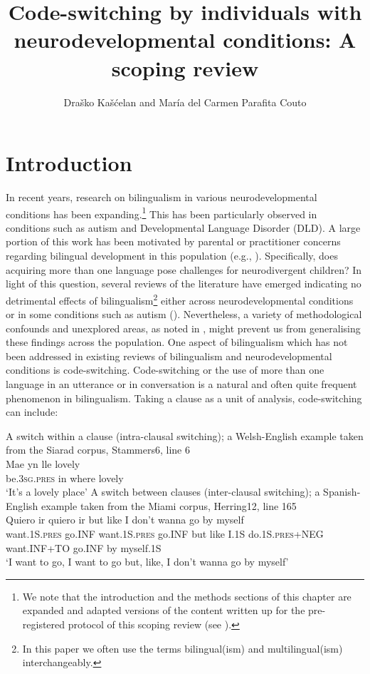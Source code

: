 \documentclass[output=paper]{langscibook}
\author{Draško Kašćelan\orcid{}\affiliation{University of Essex} and María del Carmen Parafita Couto\orcid{}\affiliation{University of Santiago de Compostela}}
\title[Code-switching by individuals with neurodevelopmental conditions]{Code-switching by individuals with neurodevelopmental conditions: A scoping review}
\begin{document}
\maketitle 

\section{Introduction}

In recent years, research on bilingualism in various neurodevelopmental conditions has been expanding.\footnote{We note that the introduction and the methods sections of this chapter are expanded and adapted versions of the content written up for the pre-registered protocol of this scoping review (see \citealt{KascelanParafitaCouto2022}).} This has been particularly observed in conditions such as autism and Developmental Language Disorder (DLD). A large portion of this work has been motivated by parental or practitioner concerns regarding bilingual development in this population (e.g.,  \citealt{Kay-RainingBirdEtAl2012}). Specifically, does acquiring more than one language pose challenges for neurodivergent children? In light of this question, several reviews of the literature have emerged indicating no detrimental effects of bilingualism\footnote{In this paper we often use the terms bilingual(ism) and multilingual(ism) interchangeably.} either across neurodevelopmental conditions \citep{UljarevićEtAl2016} or in some conditions such as autism (\citealt{PrévostTuller2021}). Nevertheless, a variety of methodological confounds and unexplored areas, as noted in \citet{PrévostTuller2021}, might prevent us from generalising these findings across the population.
One aspect of bilingualism which has not been addressed in existing reviews of bilingualism and neurodevelopmental conditions is code-switching. Code-switching or the use of more than one language in an utterance or in conversation is a natural and often quite frequent phenomenon in bilingualism. Taking a clause as a unit of analysis, code-switching can include:

\ea
  \ea \label{ex1a} A switch within a clause (intra-clausal switching); a Welsh-English example taken from the Siarad corpus, Stammers6, line 6 \citep{DeucharEtAl2014}\\
      \gll Mae      yn    lle    lovely\\
      be.3\textsc{sg}.\textsc{pres}  in  where  lovely\\
      \glt ‘It’s a lovely place’
  \ex \label{ex1b} A switch between clauses (inter-clausal switching); a Spanish-English example taken from the Miami corpus, Herring12, line 165 \citep{DeucharEtAl2014}\\
      \gll Quiero      ir        quiero      ir   but    like    I      don’t   wanna             go     by    myself\\
      want.1S.\textsc{pres}    go.INF      want.1S.\textsc{pres}   go.INF but  like  I.1S  do.1S.\textsc{pres}+NEG want.INF+TO  go.INF  by    myself.1S\\
      \glt ‘I want to go, I want to go but, like, I don’t wanna go by myself’
  \z
\z
\end{document}
